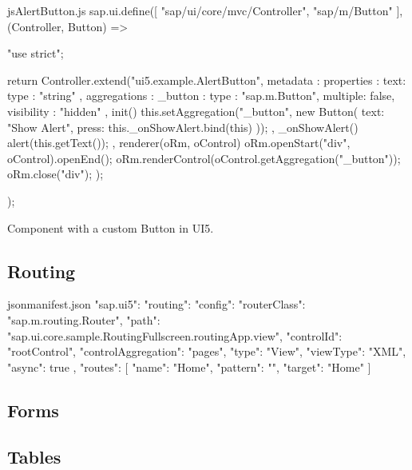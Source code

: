 \begin{listing}[h!]
\begin{myminted}{js}{AlertButton.js}
sap.ui.define([
  "sap/ui/core/mvc/Controller",
  "sap/m/Button"
], (Controller, Button) => {
  "use strict";

  return Controller.extend("ui5.example.AlertButton", {
    metadata : {
      properties : {
        text: 	{type : "string" }
      },
      aggregations : {
        _button : {
          type : "sap.m.Button", 
          multiple: false, 
          visibility : "hidden"
        }
      }
    },
    init() {
      this.setAggregation("_button", new Button({
        text: "Show Alert",
        press: this._onShowAlert.bind(this)
      }));
    },
    _onShowAlert() {
        alert(this.getText());
    },
    renderer(oRm, oControl) {
      oRm.openStart("div", oControl).openEnd();
      oRm.renderControl(oControl.getAggregation("_button"));
      oRm.close("div");
    }
  });
});
\end{myminted}
\caption{Component with a custom Button in UI5.}
\label{fig:evaluation-component-ui5}
\end{listing}

\subsection{Routing}

\begin{myminted}{json}{manifest.json}
{
  "sap.ui5": {
    "routing": {
      "config": {
        "routerClass": "sap.m.routing.Router",
        "path": "sap.ui.core.sample.RoutingFullscreen.routingApp.view",
        "controlId": "rootControl",
        "controlAggregation": "pages",
        "type": "View",
        "viewType": "XML",
        "async": true
      },
      "routes": [
        {
          "name": "Home",
          "pattern": "",
          "target": "Home"
        }
      ]
    }
  }
}
\end{myminted}

\subsection{Forms}

\subsection{Tables}

